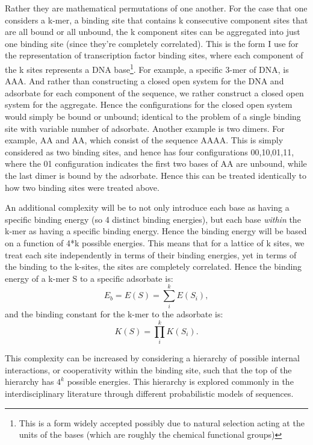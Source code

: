 Rather they are mathematical permutations of one another.  For the case that one considers a k-mer, a binding site that contains k consecutive component sites that are all bound or all unbound, the k component sites can be aggregated into just one binding site (since they're completely correlated).  This is the form I use for the representation of transcription factor binding sites, where each component of the k sites represents a DNA base\footnote{This is a form widely accepted possibly due to natural selection acting at the units of the bases (which are roughly the chemical functional groups)}.  For example, a specific 3-mer of DNA, is AAA.  And rather than constructing a closed open system for the DNA and adsorbate for each component of the sequence, we rather construct a closed open system for the aggregate.  Hence the configurations for the closed open system would simply be bound or unbound; identical to the problem of a single binding site with variable number of adsorbate.  Another example is two dimers.  For example, AA and AA, which consist of the sequence AAAA.  This is simply considered as two binding sites, and hence has four configurations 00,10,01,11, where the 01 configuration indicates the first two bases of AA are unbound, while the last dimer is bound by the adsorbate.  Hence this can be treated identically to how two binding sites were treated above.

An additional complexity will be to not only introduce each base as having a specific binding energy (so 4 distinct binding energies), but each base \textit{within} the k-mer as having a specific binding energy.  Hence the binding energy will be based on a function of 4*k possible energies.  This means that for a lattice of k sites, we treat each site independently in terms of their binding energies, yet in terms of the binding to the k-sites, the sites are completely correlated.  Hence the binding energy of a k-mer S to a specific adsorbate is:
\begin{equation}
E_b= E(S)=\sum_i^k E(S_i),
\end{equation}
and the binding constant for the k-mer to the adsorbate is:
\begin{equation}
K(S)=\prod_i^k K(S_i).
\end{equation}

  This complexity can be increased by considering a hierarchy of possible internal interactions, or cooperativity within the binding site, such that the top of the hierarchy has $4^k$ possible energies.  This hierarchy is explored commonly in the interdisciplinary literature through different probabilistic models of sequences. 

